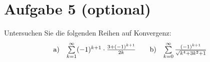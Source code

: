 \section{Aufgabe 5 (optional)}

Untersuchen Sie die folgenden Reihen auf Konvergenz:
\begin{align*}
  \begin{array}{ c c }
    \text{a)} & \sum\limits _{k=1}^{\infty }( -1)^{k+1} \cdot \frac{3+( -1)^{k+1}}{2k}
  \end{array} & & \begin{array}{ c c }
    \text{b)} & \sum\limits _{k=0}^{\infty }\frac{( -1)^{k+1}}{\sqrt{k^{4} +3k^{2} +1}}
  \end{array}
\end{align*}
